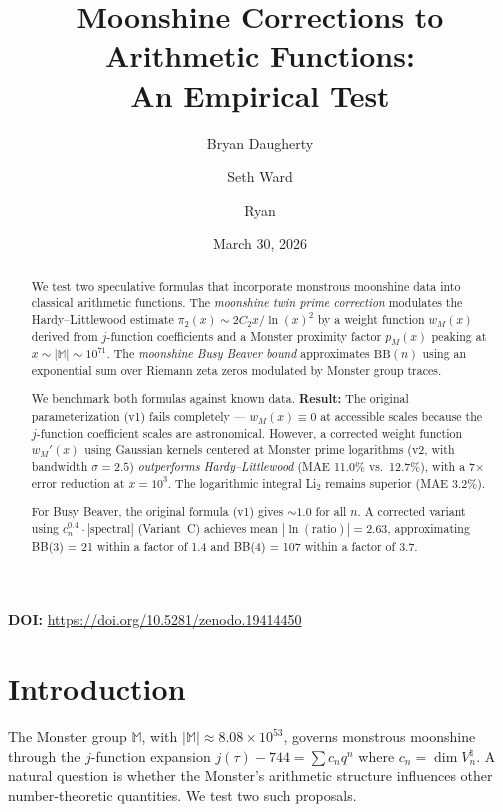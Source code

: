 \documentclass[11pt]{amsart}
\title[Moonshine Corrections to Arithmetic Functions]{Moonshine Corrections to Arithmetic Functions:\\An Empirical Test}
\author{Bryan Daugherty}
\author{Seth Ward}
\author{Ryan}
\date{March 30, 2026}
\theoremstyle{definition}
\begin{document}
\begin{abstract}
We test two speculative formulas that incorporate monstrous moonshine data into classical arithmetic functions. The \emph{moonshine twin prime correction} modulates the Hardy--Littlewood estimate $\pi_2(x) \sim 2C_2 x / \ln(x)^2$ by a weight function $w_M(x)$ derived from $j$-function coefficients and a Monster proximity factor $p_M(x)$ peaking at $x \sim |\mathbb{M}| \sim 10^{71}$. The \emph{moonshine Busy Beaver bound} approximates $\mathrm{BB}(n)$ using an exponential sum over Riemann zeta zeros modulated by Monster group traces.

We benchmark both formulas against known data. \textbf{Result:} The original parameterization (v1) fails completely --- $w_M(x) \equiv 0$ at accessible scales because the $j$-function coefficient scales are astronomical. However, a corrected weight function $w_M'(x)$ using Gaussian kernels centered at Monster prime logarithms (v2, with bandwidth $\sigma = 2.5$) \emph{outperforms Hardy--Littlewood} (MAE 11.0\% vs.\ 12.7\%), with a 7$\times$ error reduction at $x = 10^3$. The logarithmic integral Li$_2$ remains superior (MAE 3.2\%).

For Busy Beaver, the original formula (v1) gives $\sim 1.0$ for all $n$. A corrected variant using $c_n^{0.4} \cdot |\text{spectral}|$ (Variant~C) achieves mean $|\ln(\text{ratio})| = 2.63$, approximating BB(3) = 21 within a factor of 1.4 and BB(4) = 107 within a factor of 3.7.
\end{abstract}

\vspace{0.5em}
\noindent\textbf{DOI:} \url{https://doi.org/10.5281/zenodo.19414450}

\maketitle
\tableofcontents

\section{Introduction}

The Monster group $\mathbb{M}$, with $|\mathbb{M}| \approx 8.08 \times 10^{53}$, governs monstrous moonshine through the $j$-function expansion $j(\tau) - 744 = \sum c_n q^n$ where $c_n = \dim V_n^\natural$. A natural question is whether the Monster's arithmetic structure influences other number-theoretic quantities. We test two such proposals.
\end{document}
